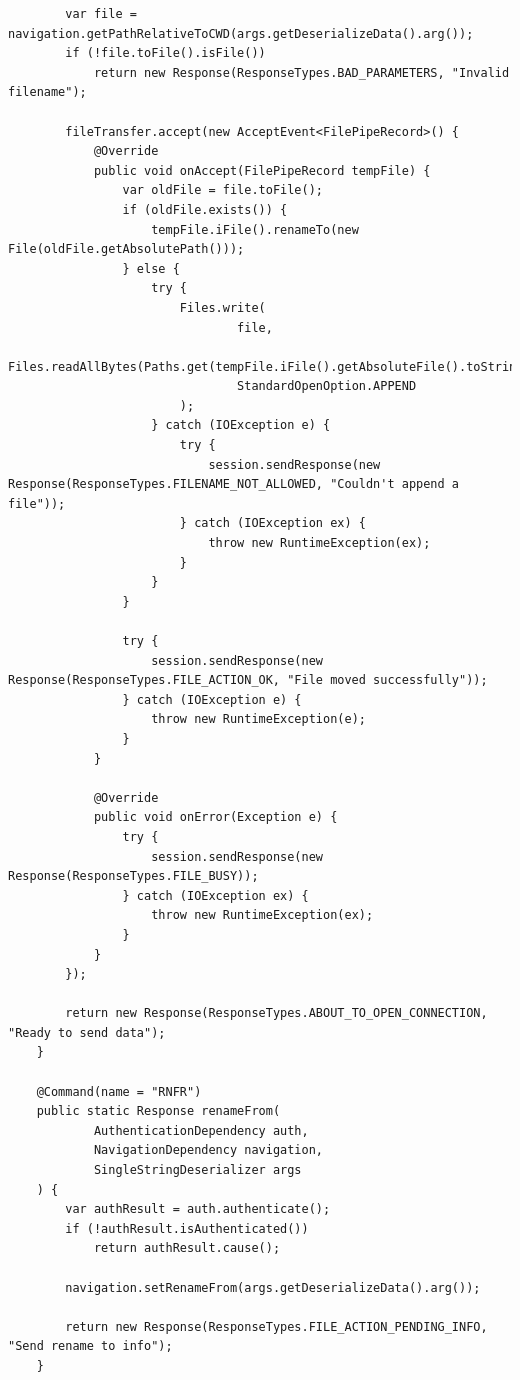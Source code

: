 \documentclass[a4paper,14pt]{extarticle}
\begin{document}
\begin{verbatim}
        var file = navigation.getPathRelativeToCWD(args.getDeserializeData().arg());
        if (!file.toFile().isFile())
            return new Response(ResponseTypes.BAD_PARAMETERS, "Invalid filename");

        fileTransfer.accept(new AcceptEvent<FilePipeRecord>() {
            @Override
            public void onAccept(FilePipeRecord tempFile) {
                var oldFile = file.toFile();
                if (oldFile.exists()) {
                    tempFile.iFile().renameTo(new File(oldFile.getAbsolutePath()));
                } else {
                    try {
                        Files.write(
                                file,
                                Files.readAllBytes(Paths.get(tempFile.iFile().getAbsoluteFile().toString())),
                                StandardOpenOption.APPEND
                        );
                    } catch (IOException e) {
                        try {
                            session.sendResponse(new Response(ResponseTypes.FILENAME_NOT_ALLOWED, "Couldn't append a file"));
                        } catch (IOException ex) {
                            throw new RuntimeException(ex);
                        }
                    }
                }

                try {
                    session.sendResponse(new Response(ResponseTypes.FILE_ACTION_OK, "File moved successfully"));
                } catch (IOException e) {
                    throw new RuntimeException(e);
                }
            }

            @Override
            public void onError(Exception e) {
                try {
                    session.sendResponse(new Response(ResponseTypes.FILE_BUSY));
                } catch (IOException ex) {
                    throw new RuntimeException(ex);
                }
            }
        });

        return new Response(ResponseTypes.ABOUT_TO_OPEN_CONNECTION, "Ready to send data");
    }

    @Command(name = "RNFR")
    public static Response renameFrom(
            AuthenticationDependency auth,
            NavigationDependency navigation,
            SingleStringDeserializer args
    ) {
        var authResult = auth.authenticate();
        if (!authResult.isAuthenticated())
            return authResult.cause();

        navigation.setRenameFrom(args.getDeserializeData().arg());

        return new Response(ResponseTypes.FILE_ACTION_PENDING_INFO, "Send rename to info");
    }


\end{verbatim}
\end{document}
